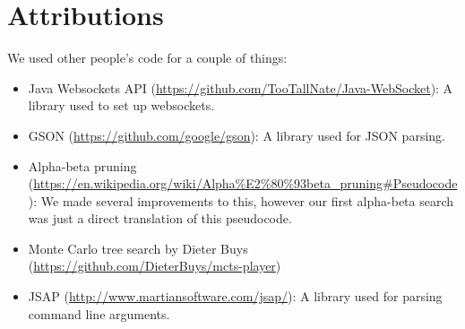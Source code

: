 \section{Attributions}

We used other people's code for a couple of things:

\begin{itemize}
\item Java Websockets API (\url{https://github.com/TooTallNate/Java-WebSocket}): A library used to set up websockets.
\item GSON (\url{https://github.com/google/gson}): A library used for JSON parsing.
\item Alpha-beta pruning (\url{https://en.wikipedia.org/wiki/Alpha%E2%80%93beta_pruning#Pseudocode}): We made several improvements to this, however our first alpha-beta search was just a direct translation of this pseudocode.
\item Monte Carlo tree search by Dieter Buys (\url{https://github.com/DieterBuys/mcts-player})
\item JSAP (\url{http://www.martiansoftware.com/jsap/}): A library used for parsing command line arguments.
\end{itemize}